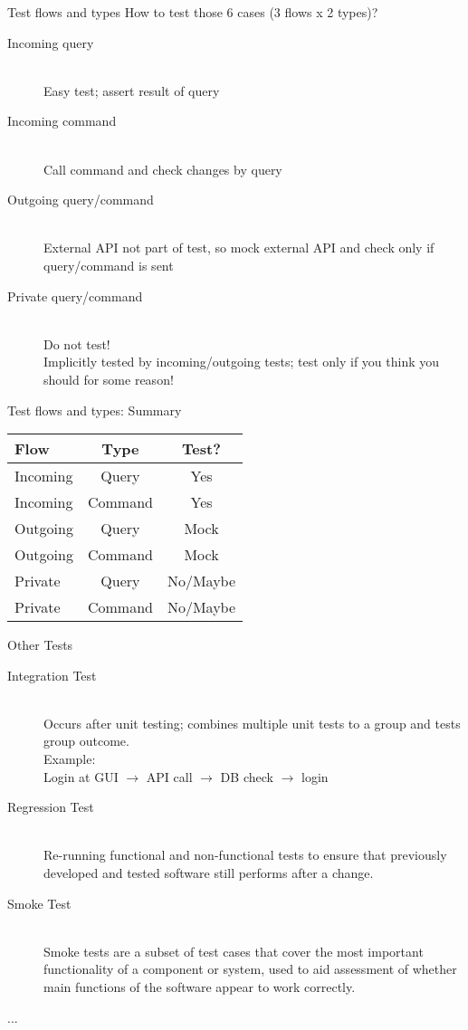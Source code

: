 \begin{frame}{Test flows and types}
How to test those 6 cases (3 flows x 2 types)?
\begin{description}
\item[Incoming query] \hfill\\
 Easy test; assert result of query
\item[Incoming command] \hfill\\
Call command and check changes by query
\item[Outgoing query/command] \hfill\\
External API not part of test, so mock external API and check only if query/command is sent
\item[Private query/command] \hfill\\
Do not test!\\
Implicitly tested by incoming/outgoing tests; test only if you think you should for some reason!
\end{description}
\end{frame}

\begin{frame}{Test flows and types: Summary}
\centering\begin{tabular}{ l c c}
  \textbf{Flow} & \textbf{Type} & \textbf{Test?} \\
  \hline
  Incoming & Query & Yes \\
  Incoming & Command & Yes \\
  Outgoing & Query & Mock \\
  Outgoing & Command & Mock \\
  Private & Query & No/Maybe \\
  Private & Command & No/Maybe \\
\end{tabular}
\end{frame}

\begin{frame}{Other Tests}
\begin{description}
\item[Integration Test] \hfill\\
Occurs after unit testing; combines multiple unit tests to a group and tests group outcome.\\
Example:\\
Login at GUI $\rightarrow$ API call $\rightarrow$ DB check $\rightarrow$ login
\item[Regression Test] \hfill \\
Re-running functional and non-functional tests to ensure that previously developed and tested software still performs after a change.
\item[Smoke Test] \hfill\\
Smoke tests are a subset of test cases that cover the most important functionality of a component or system, used to aid assessment of whether main functions of the software appear to work correctly.
\item[...]
\end{description}
\end{frame}